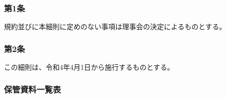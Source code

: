 \documentclass[
  luatex,
  paper=a4paper,
  fontsize=11pt,
  jafontsize=11pt,
  jlreq_notes,
]{jlreq}
\begin{document}
  \subsubsection*{第1条}
  規約並びに本細則に定めのない事項は理事会の決定によるものとする。
  \subsubsection*{第2条}
  この細則は、令和4年4月1日から施行するものとする。
  
  \setlength{\arrayrulewidth}{0.2pt}
  
  \newpage
  \subsubsection*{保管資料一覧表}
\end{document}
